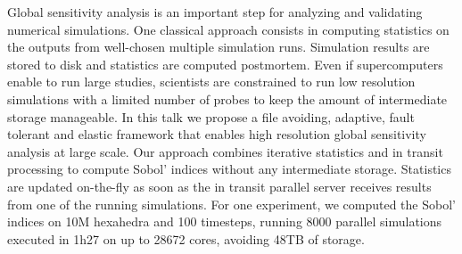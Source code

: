 \license


Global sensitivity analysis is an important step for analyzing and validating numerical simulations. One classical approach consists in computing statistics on the outputs from well-chosen multiple simulation runs. Simulation results are stored to disk and statistics are computed postmortem. Even if supercomputers enable to run large studies, scientists are constrained to run low resolution simulations with a limited number of probes to keep the amount of intermediate storage manageable. In this talk we propose a file avoiding, adaptive, fault tolerant and elastic framework that enables high resolution global sensitivity analysis at large scale. Our approach combines iterative statistics and in transit processing to compute Sobol’ indices without any intermediate storage. Statistics are updated on-the-fly as soon as the in transit parallel server receives results from one of the running simulations. For one experiment, we computed the Sobol’ indices on 10M hexahedra and 100 timesteps, running 8000 parallel simulations executed in 1h27 on up to 28672 cores, avoiding 48TB of storage.


